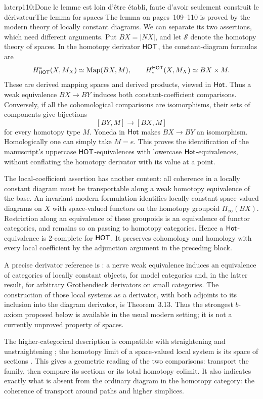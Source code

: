 \begin{dcomment}{later}{p110:Donc le lemme est loin d'être établi, faute d'avoir seulement construit le dérivateur}{The lemma for spaces}
The lemma on pages~109--110 is proved by the modern theory of locally constant diagrams. We can separate its two assertions, which need different arguments. Put $BX=|NX|$, and let $\mathcal S$ denote the homotopy theory of spaces. In the homotopy derivator $\mathsf{HOT}$, the constant-diagram formulas are
\[
 H^*_{\mathsf{HOT}}(X,M_X)\simeq\operatorname{Map}(BX,M),
 \qquad
 H_*^{\mathsf{HOT}}(X,M_X)\simeq BX\times M.
\]
These are derived mapping spaces and derived products, viewed in $\mathsf{Hot}$. Thus a weak equivalence $BX\to BY$ induces both constant-coefficient comparisons. Conversely, if all the cohomological comparisons are isomorphisms, their sets of components give bijections
\[
 [BY,M]\longrightarrow[BX,M]
\]
for every homotopy type $M$. Yoneda in $\mathsf{Hot}$ makes $BX\to BY$ an isomorphism. Homologically one can simply take $M=e$. This proves the identification of the manuscript's uppercase $\mathsf{HOT}$-equivalences with lowercase $\mathsf{Hot}$-equivalences, without conflating the homotopy derivator with its value at a point.

The local-coefficient assertion has another content: all coherence in a locally constant diagram must be transportable along a weak homotopy equivalence of the base. An invariant modern formulation identifies locally constant space-valued diagrams on $X$ with space-valued functors on the homotopy groupoid $\Pi_\infty(BX)$. Restriction along an equivalence of these groupoids is an equivalence of functor categories, and remains so on passing to homotopy categories. Hence a $\mathsf{Hot}$-equivalence is 2-complete for $\mathsf{HOT}$. It preserves cohomology and homology with every local coefficient by the adjunction argument in the preceding block.

A precise derivator reference is \citet[Theorem~1.3 and Corollary~3.8]{Cisinski2009LocallyConstant}: a nerve weak equivalence induces an equivalence of categories of locally constant objects, for model categories and, in the latter result, for arbitrary Grothendieck derivators on small categories. The construction of those local systems as a derivator, with both adjoints to its inclusion into the diagram derivator, is Theorem~3.13. Thus the strongest $b$-axiom proposed below is available in the usual modern setting; it is not a currently unproved property of spaces.

The higher-categorical description is compatible with straightening and unstraightening \citep[Theorem~2.2.1.2]{Lurie2009HTT}; the homotopy limit of a space-valued local system is its space of sections \citep[Corollary~3.3.3.4]{Lurie2009HTT}. This gives a geometric reading of the two comparisons: transport the family, then compare its sections or its total homotopy colimit. It also indicates exactly what is absent from the ordinary diagram in the homotopy category: the coherence of transport around paths and higher simplices.


\end{dcomment}
